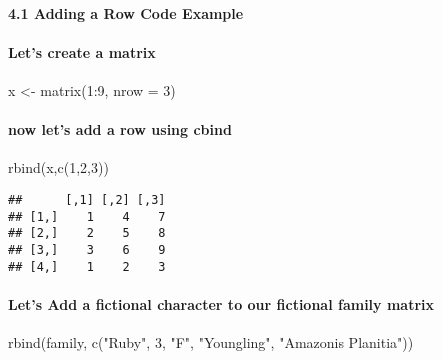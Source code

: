 \documentclass[
]{article}
\newenvironment{Shaded}{\begin{snugshade}}{\end{snugshade}}
\newcommand{\AttributeTok}[1]{\textcolor[rgb]{0.77,0.63,0.00}{#1}}
\newcommand{\DecValTok}[1]{\textcolor[rgb]{0.00,0.00,0.81}{#1}}
\newcommand{\FunctionTok}[1]{\textcolor[rgb]{0.00,0.00,0.00}{#1}}
\newcommand{\NormalTok}[1]{#1}
\newcommand{\OtherTok}[1]{\textcolor[rgb]{0.56,0.35,0.01}{#1}}
\newcommand{\SpecialCharTok}[1]{\textcolor[rgb]{0.00,0.00,0.00}{#1}}
\newcommand{\StringTok}[1]{\textcolor[rgb]{0.31,0.60,0.02}{#1}}
\begin{document}
\hypertarget{adding-a-row-code-example}{%
\paragraph{4.1 Adding a Row Code
Example}\label{adding-a-row-code-example}}

\hypertarget{lets-create-a-matrix}{%
\paragraph{Let's create a matrix}\label{lets-create-a-matrix}}

\begin{Shaded}
\begin{Highlighting}[]
\NormalTok{x }\OtherTok{\textless{}{-}} \FunctionTok{matrix}\NormalTok{(}\DecValTok{1}\SpecialCharTok{:}\DecValTok{9}\NormalTok{, }\AttributeTok{nrow =} \DecValTok{3}\NormalTok{)}
\end{Highlighting}
\end{Shaded}

\hypertarget{now-lets-add-a-row-using-cbind}{%
\paragraph{now let's add a row using
cbind}\label{now-lets-add-a-row-using-cbind}}

\begin{Shaded}
\begin{Highlighting}[]
\FunctionTok{rbind}\NormalTok{(x,}\FunctionTok{c}\NormalTok{(}\DecValTok{1}\NormalTok{,}\DecValTok{2}\NormalTok{,}\DecValTok{3}\NormalTok{))}
\end{Highlighting}
\end{Shaded}

\begin{verbatim}
##      [,1] [,2] [,3]
## [1,]    1    4    7
## [2,]    2    5    8
## [3,]    3    6    9
## [4,]    1    2    3
\end{verbatim}

\hypertarget{lets-add-a-fictional-character-to-our-fictional-family-matrix}{%
\paragraph{Let's Add a fictional character to our fictional family
matrix}\label{lets-add-a-fictional-character-to-our-fictional-family-matrix}}

\begin{Shaded}
\begin{Highlighting}[]
\FunctionTok{rbind}\NormalTok{(family, }\FunctionTok{c}\NormalTok{(}\StringTok{"Ruby"}\NormalTok{, }\DecValTok{3}\NormalTok{, }\StringTok{"F"}\NormalTok{, }\StringTok{"Youngling"}\NormalTok{, }\StringTok{"Amazonis Planitia"}\NormalTok{))}
\end{Highlighting}
\end{Shaded}
\end{document}
